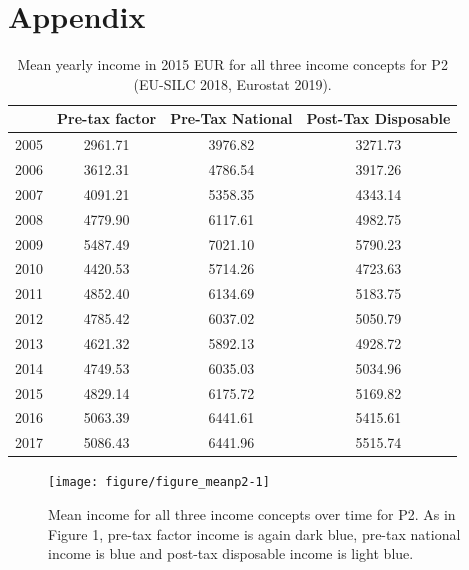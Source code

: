 \documentclass[a4paper]{article}\usepackage[]{graphicx}\usepackage[]{color}
\newenvironment{knitrout}{}{} %
\begin{document}
\section{Appendix}
\begin{table}[ht]
\centering
\begin{tabular}{lccc}
  \toprule
 & Pre-tax factor & Pre-Tax National & Post-Tax Disposable \\ 
  \midrule
2005 & 2961.71 & 3976.82 & 3271.73 \\ 
  2006 & 3612.31 & 4786.54 & 3917.26 \\ 
  2007 & 4091.21 & 5358.35 & 4343.14 \\ 
  2008 & 4779.90 & 6117.61 & 4982.75 \\ 
  2009 & 5487.49 & 7021.10 & 5790.23 \\ 
  2010 & 4420.53 & 5714.26 & 4723.63 \\ 
  2011 & 4852.40 & 6134.69 & 5183.75 \\ 
  2012 & 4785.42 & 6037.02 & 5050.79 \\ 
  2013 & 4621.32 & 5892.13 & 4928.72 \\ 
  2014 & 4749.53 & 6035.03 & 5034.96 \\ 
  2015 & 4829.14 & 6175.72 & 5169.82 \\ 
  2016 & 5063.39 & 6441.61 & 5415.61 \\ 
  2017 & 5086.43 & 6441.96 & 5515.74 \\ 
   \bottomrule
\end{tabular}
\caption{Mean yearly income in 2015 EUR for all three income concepts for P2 (EU-SILC 2018, Eurostat 2019).} 
\label{mean_p2}
\end{table}


\begin{knitrout}
\color{fgcolor}\begin{figure}[H]

{\centering \texttt{[image: figure/figure\_meanp2-1]} 

}

\caption[Mean income for all three income concepts over time for P2]{Mean income for all three income concepts over time for P2. As in Figure 1, pre-tax factor income is again dark blue, pre-tax national income is blue and post-tax disposable income is light blue.}\label{fig:figure_meanp2}
\end{figure}


\end{knitrout}
\end{document}
